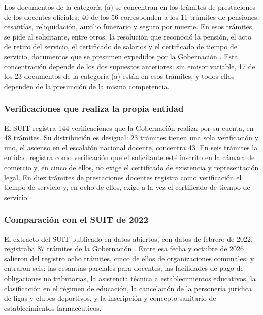 Los documentos de la categoría (a) se concentran en los trámites de prestaciones de los docentes oficiales: 40 de los 56 corresponden a los 11 trámites de pensiones, cesantías, reliquidación, auxilio funerario y seguro por muerte. En esos trámites se pide al solicitante, entre otros, la resolución que reconoció la pensión, el acto de retiro del servicio, el certificado de salarios y el certificado de tiempo de servicio, documentos que se presumen expedidos por la Gobernación . Esta concentración depende de los dos supuestos anteriores: sin emisor variable, 17 de los 23 documentos de la categoría (a) están en esos trámites, y todos ellos dependen de la presunción de la misma competencia.

\subsubsection{Verificaciones que realiza la propia entidad}

El SUIT registra 144 verificaciones que la Gobernación realiza por su cuenta, en 48 trámites. Su distribución es desigual: 23 trámites tienen una sola verificación y uno, el ascenso en el escalafón nacional docente, concentra 43. En seis trámites la entidad registra como verificación que el solicitante esté inscrito en la cámara de comercio y, en cinco de ellos, no exige el certificado de existencia y representación legal. En diez trámites de prestaciones docentes registra como verificación el tiempo de servicio y, en ocho de ellos, exige a la vez el certificado de tiempo de servicio.

\subsubsection{Comparación con el SUIT de 2022}

El extracto del SUIT publicado en datos abiertos, con datos de febrero de 2022, registraba 87 trámites de la Gobernación \parencite{funcionpublica2022suit}. Entre esa fecha y octubre de 2026 salieron del registro ocho trámites, cinco de ellos de organizaciones comunales, y entraron seis: las cesantías parciales para docentes, las facilidades de pago de obligaciones no tributarias, la asistencia técnica a establecimientos educativos, la clasificación en el régimen de educación, la cancelación de la personería jurídica de ligas y clubes deportivos, y la inscripción y concepto sanitario de establecimientos farmacéuticos.

